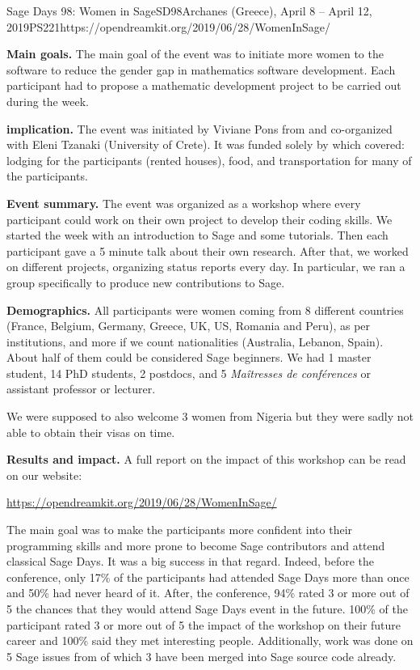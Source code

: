 \begin{event}{Sage Days 98: Women in Sage}{SD98}{Archanes (Greece), April 8 -- April 12, 2019}{PS}{22}{1}{https://opendreamkit.org/2019/06/28/WomenInSage/}

\textbf{Main goals.} The main goal of the event was to initiate more women to the software \Sage to reduce the gender gap in mathematics software
development. Each participant had to propose a mathematic development project to be carried out during the week.

\textbf{\ODK implication.} The event was initiated by Viviane Pons from \ODK and co-organized with Eleni Tzanaki (University of Crete). It was funded solely by \ODK which covered: lodging for the participants (rented houses), food, and transportation for many of the participants.

\textbf{Event summary.} The event was organized as a workshop where every participant could work on their own project to develop their coding skills. We started the week with an introduction to Sage and some tutorials. Then each participant gave a 5 minute talk about their own research. After that, we worked on different projects, organizing status reports every day. In particular, we ran a group specifically to produce new contributions to Sage.

\textbf{Demographics.} All participants were women coming from 8 different countries (France, Belgium, Germany, Greece, UK, US, Romania and Peru), as per institutions, and more if we count nationalities (Australia, Lebanon, Spain). About half of them could be considered Sage beginners. We had 1 master student, 14 PhD students, 2 postdocs, and 5 \textit{Maîtresses de conférences} or assistant professor or lecturer.

We were supposed to also welcome 3 women from Nigeria but they were sadly not able to obtain their visas on time.

\textbf{Results and impact.} A full report on the impact of this
workshop can be read on our website:
\centerline{\url{https://opendreamkit.org/2019/06/28/WomenInSage/}}
The main goal was to make the participants more confident into their programming skills and more prone to become Sage contributors and attend classical Sage Days. It was a big success in that regard. Indeed, before the conference, only 17\% of the participants had attended Sage Days more than once and 50\% had never heard of it. After, the conference, 94\% rated 3 or more out of 5 the chances that they would attend Sage Days event in the future. 100\% of the participant rated 3 or more out of 5 the impact of the workshop on their future career and 100\% said they met interesting people. Additionally, work was done on 5 Sage issues from of which 3 have been merged into Sage source code already.


\end{event}
